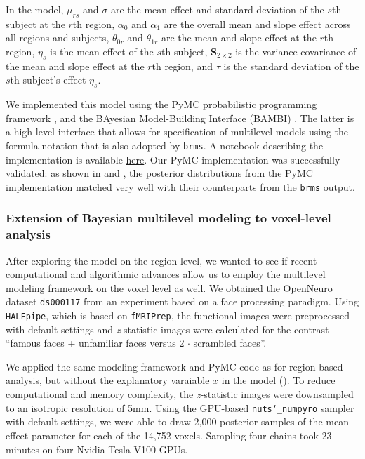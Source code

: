 \documentclass[../main.tex]{subfiles}
\begin{document}
\noindent
In the model, $\mu_{rs}$ and $\sigma$ are the mean effect and standard deviation of the $s$th subject at the $r$th region, $\alpha_0$ and $\alpha_1$ are the overall mean and slope effect across all regions and subjects, $\theta_{0r}$ and $\theta_{1r}$ are the mean and slope effect at the $r$th region, $\eta_s$ is the mean effect of the $s$th subject, $\boldsymbol{S}_{2\times 2}$ is the variance-covariance of the mean and slope effect at the $r$th region, and $\tau$ is the standard deviation of the $s$th subject's effect $\eta_s$.%

We implemented this model using the PyMC probabilistic programming framework \cite{Salvatier2016}, and the BAyesian Model-Building Interface (BAMBI) \cite{capretto2020}. The latter is a high-level interface that allows for specification of multilevel models using the formula notation that is also adopted by \texttt{brms}. A notebook describing the implementation is available \href{https://github.com/crnolan/pyrba}{here}. Our PyMC implementation was successfully validated: as shown in  and ,  the posterior distributions from the PyMC implementation matched very well with their counterparts from the \texttt{brms} output.%

\subsubsection{Extension of Bayesian multilevel modeling to voxel-level analysis}

After exploring the model on the region level, we wanted to see if recent computational and algorithmic advances allow us to employ the multilevel modeling framework on the voxel level as well. We obtained the OpenNeuro dataset \texttt{ds000117}\cite{wakeman_multi-subject_2015} from an experiment based on  a face processing paradigm. Using \texttt{HALFpipe}\cite{waller_enigma_2022}, which is based on \texttt{fMRIPrep}\cite{esteban_fmriprep_2019}, the functional images were preprocessed with default settings and \emph{z}-statistic images were calculated for the contrast ``famous faces + unfamiliar faces versus 2 $\cdot$ scrambled faces''. 

We applied the same modeling framework and PyMC code as for region-based analysis, but without the explanatory varaiable $x$ in the model (). To reduce computational and memory complexity, the \emph{z}-statistic images were downsampled to an isotropic resolution of 5mm. Using the GPU-based \texttt{nuts\char`_numpyro} sampler\cite{phan_composable_2019} with default settings, we were able to draw 2,000 posterior samples of the mean effect parameter for each of the 14,752 voxels. Sampling four chains took 23 minutes on four Nvidia Tesla V100 GPUs.
\end{document}
